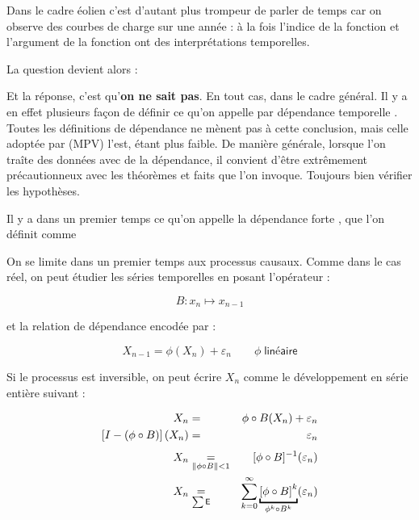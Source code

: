 \bigskip

Dans le cadre éolien c'est d'autant plus trompeur de parler de temps car on observe des courbes de charge sur une année : à la fois l'indice de la fonction et l'argument de la fonction ont des interprétations temporelles.

\smallskip

\noindent{}

\bigskip

\noindent La question devient alors :

\noindent Et la réponse, c'est qu'\textbf{on ne sait pas}. En tout cas, dans le cadre général. Il y a en effet plusieurs façon de définir ce qu'on appelle par \og dépendance temporelle \fg. Toutes les définitions de dépendance ne mènent pas à cette conclusion, mais celle adoptée par (MPV) l'est, étant plus faible. De manière générale, lorsque l'on traîte des données avec de la dépendance, il convient d'être extrêmement précautionneux avec les théorèmes et \og faits \fg que l'on invoque. Toujours bien vérifier les hypothèses.

Il y a dans un premier temps ce qu'on appelle la dépendance \og forte \fg, que l'on définit comme 

On se limite dans un premier temps aux processus causaux. Comme dans le cas réel, on peut étudier les séries temporelles en posant l'opérateur :

$$B : x_n \mapsto x_{n-1}$$

et la relation de dépendance encodée par :

$$X_{n-1} = \phi(X_n) + \varepsilon_n \qquad \phi \; \textsf{linéaire}$$

Si le processus est inversible, on peut écrire $X_n$ comme le développement en série entière suivant :

\begin{align*}
    X_n &=& \phi \circ B(X_n) + \varepsilon_n\\
    \left[I - (\phi \circ B)\right](X_n) &\underset{\textsf{}} =& \varepsilon_n 
    \\
    X_n&\underset{\Vert \phi \circ B \Vert < 1} =& \inverse{[\phi \circ B]} (\varepsilon_n)
    \\
    X_n &\underset{\sum \textsf{E}} =& \sum\limits_{k=0}^\infty \underbracket{\left[ \phi \circ B \right]^k}_{\phi^k \circ B^k}(\varepsilon_n)
\end{align*}



